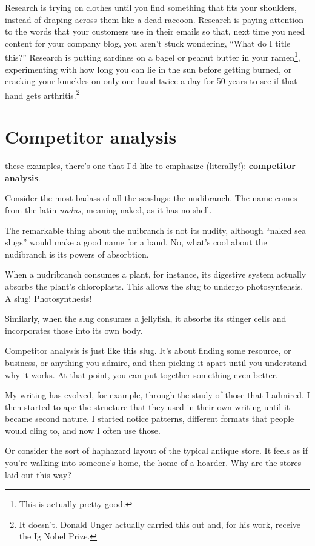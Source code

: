 Research is trying on clothes until you find something that fits your shoulders,
instead of draping across them like a dead raccoon. Research is paying attention
to the words that your customers use in their emails so that, next time you need
content for your company blog, you aren't stuck wondering, ``What do I title
this?'' Research is putting sardines on a bagel or peanut butter in your
ramen\footnote{This is actually pretty good.}, experimenting with how long you
can lie in the sun before getting burned, or cracking your knuckles on only one
hand twice a day for 50 years to see if that hand gets arthritis.\footnote{It
  doesn't. Donald Unger actually carried this out and, for his work, receive the
  Ig Nobel Prize.}

\section{Competitor analysis}

 these examples, there's one that I'd like to emphasize
(literally!): \textbf{competitor analysis}.

Consider the most badass of all the seaslugs: the nudibranch. The name comes
from the latin \textit{nudus}, meaning naked, as it has no shell.

The remarkable thing about the nuibranch is not its nudity, although ``naked sea
slugs'' would make a good name for a band. No, what's cool about the nudibranch
is its powers of absorbtion.

When a nudribranch consumes a plant, for instance, its digestive system actually
absorbs the plant's chloroplasts. This allows the slug to undergo
photosyntehsis. A slug! Photosynthesis!

Similarly, when the slug consumes a jellyfish, it absorbs its stinger cells and
incorporates those into its own body.

Competitor analysis is just like this slug. It's about finding some resource, or
business, or anything you admire, and then picking it apart until you understand
why it works. At that point, you can put together something even better.

My writing has evolved, for example, through the study of those that I
admired. I then started to ape the structure that they used in their own writing
until it became second nature. I started notice patterns, different formats that
people would cling to, and now I often use those.

Or consider the sort of haphazard layout of the typical antique store. It feels
as if you're walking into someone's home, the home of a hoarder. Why are the
stores laid out this way?

